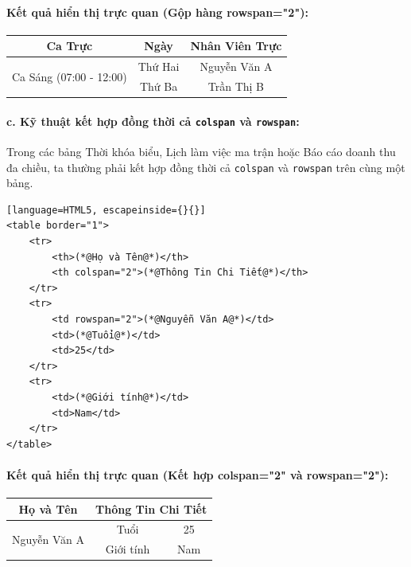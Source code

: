 \documentclass[11pt,oneside]{book}
\renewcommand{\arraystretch}{1.2}
\newcommand{\codeinline}[1]{\textcolor{accentOrange}{\texttt{#1}}}
\begin{document}
\paragraph{\textbf{Kết quả hiển thị trực quan (Gộp hàng rowspan="2"):}}
\begin{prettyTableBox}[Kết Quả Hiển Thị Gộp Hàng Rowspan (border="1")]
\centering
\vspace{4pt}
\bgroup
\renewcommand{\arraystretch}{1.4}
\setlength{\tabcolsep}{14pt}
\begin{tabular}{|c|c|c|}
\hline
\textbf{Ca Trực} & \textbf{Ngày} & \textbf{Nhân Viên Trực} \\
\hline
\multirow{2}{*}{Ca Sáng (07:00 - 12:00)} & Thứ Hai & Nguyễn Văn A \\
\cline{2-3}
 & Thứ Ba & Trần Thị B \\
\hline
\end{tabular}
\egroup
\vspace{4pt}
\end{prettyTableBox}

\paragraph{c. Kỹ thuật kết hợp đồng thời cả \codeinline{colspan} và \codeinline{rowspan}:}

Trong các bảng Thời khóa biểu, Lịch làm việc ma trận hoặc Báo cáo doanh thu đa chiều, ta thường phải kết hợp đồng thời cả \codeinline{colspan} và \codeinline{rowspan} trên cùng một bảng.

\begin{codeWindow}
\begin{lstlisting}[language=HTML5, escapeinside={}{}]
<table border="1">
    <tr>
        <th>(*@Họ và Tên@*)</th>
        <th colspan="2">(*@Thông Tin Chi Tiết@*)</th>
    </tr>
    <tr>
        <td rowspan="2">(*@Nguyễn Văn A@*)</td>
        <td>(*@Tuổi@*)</td>
        <td>25</td>
    </tr>
    <tr>
        <td>(*@Giới tính@*)</td>
        <td>Nam</td>
    </tr>
</table>
\end{lstlisting}
\end{codeWindow}

\paragraph{\textbf{Kết quả hiển thị trực quan (Kết hợp colspan="2" và rowspan="2"):}}
\begin{prettyTableBox}[Kết Quả Hiển Thị Kết Hợp Colspan \& Rowspan (border="1")]
\centering
\vspace{4pt}
\bgroup
\renewcommand{\arraystretch}{1.4}
\setlength{\tabcolsep}{14pt}
\begin{tabular}{|c|c|c|}
\hline
\textbf{Họ và Tên} & \multicolumn{2}{c|}{\textbf{Thông Tin Chi Tiết}} \\
\hline
\multirow{2}{*}{Nguyễn Văn A} & Tuổi & 25 \\
\cline{2-3}
 & Giới tính & Nam \\
\hline
\end{tabular}
\egroup
\vspace{4pt}
\end{prettyTableBox}
\end{document}
